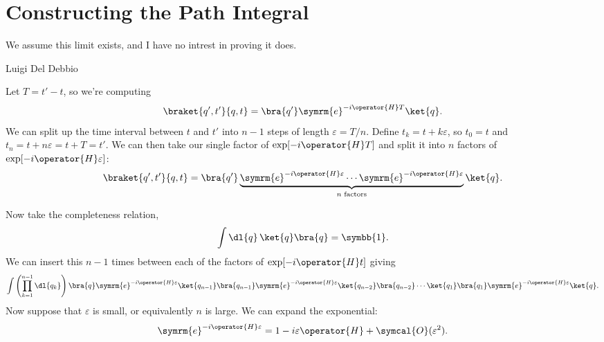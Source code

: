 \documentclass[fleqn]{NotesClass}
\newcommand{\e}{\symrm{e}}
\newcommand{\ident}{\symbb{1}}
\newcommand{\order}{\symcal{O}}
\begin{document}
    \section{Constructing the Path Integral}
    \epigraph{We assume this limit exists, and I have no intrest in proving it does.}{Luigi Del Debbio}
    Let \(T = t' - t\), so we're computing
    \begin{equation}
        \braket{q', t'}{q, t} = \bra{q'} \e^{-i\operator{H}T}\ket{q}.
    \end{equation}
    We can split up the time interval between \(t\) and \(t'\) into \(n - 1\) steps of length \(\varepsilon = T/n\).
    Define \(t_k = t + k\varepsilon\), so \(t_0 = t\) and \(t_n = t + n\varepsilon = t + T = t'\).
    We can then take our single factor of \(\exp[-i\operator{H}T]\) and split it into \(n\) factors of \(\exp[-i\operator{H}\varepsilon]\):
    \begin{equation}
        \braket{q', t'}{q, t} = \bra{q'} \underbrace{\e^{-i\operator{H}\varepsilon} \dotsm \e^{-i\operator{H}\varepsilon}}_{n \text{ factors}} \ket{q}.
    \end{equation}
    
    Now take the completeness relation,
    \begin{equation}
        \int \dl{q} \, \ket{q} \bra{q} = \ident.
    \end{equation}
    We can insert this \(n - 1\) times between each of the factors of \(\exp[-i\operator{H}t]\) giving
    \begin{equation}
        \int \left( \prod_{k = 1}^{n - 1} \dl{q_k} \right) \bra{q} \e^{-i\operator{H}\varepsilon} \ket{q_{n-1}} \bra{q_{n-1}} \e^{-i\operator{H}\varepsilon} \ket{q_{n-2}}\bra{q_{n-2}} \dotsm \ket{q_1} \bra{q_1} \e^{-i\operator{H}\varepsilon} \ket{q}.
    \end{equation}
    Now suppose that \(\varepsilon\) is small, or equivalently \(n\) is large.
    We can expand the exponential:
    \begin{equation}
        \e^{-i\operator{H}\varepsilon} = 1 - i\varepsilon\operator{H} + \order(\varepsilon^2).
    \end{equation}
    
\end{document}
